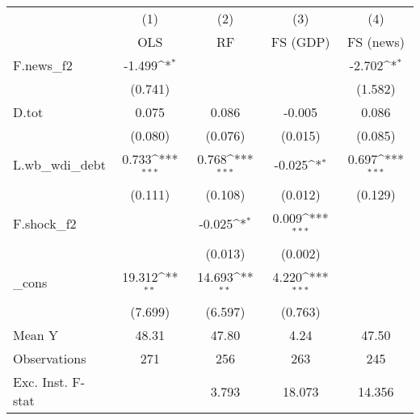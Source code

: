 {
\def\sym#1{\ifmmode^{#1}\else\(^{#1}\)\fi}
\begin{tabular}{l*{4}{c}}
\toprule
            &\multicolumn{1}{c}{(1)}&\multicolumn{1}{c}{(2)}&\multicolumn{1}{c}{(3)}&\multicolumn{1}{c}{(4)}\\
            &\multicolumn{1}{c}{OLS}&\multicolumn{1}{c}{RF}&\multicolumn{1}{c}{FS (GDP)}&\multicolumn{1}{c}{FS (news)}\\
\midrule
F.news\_f2   &      -1.499\sym{*}  &                     &                     &      -2.702\sym{*}  \\
            &     (0.741)         &                     &                     &     (1.582)         \\
\addlinespace
D.tot       &       0.075         &       0.086         &      -0.005         &       0.086         \\
            &     (0.080)         &     (0.076)         &     (0.015)         &     (0.085)         \\
\addlinespace
L.wb\_wdi\_debt&       0.733\sym{***}&       0.768\sym{***}&      -0.025\sym{*}  &       0.697\sym{***}\\
            &     (0.111)         &     (0.108)         &     (0.012)         &     (0.129)         \\
\addlinespace
F.shock\_f2  &                     &      -0.025\sym{*}  &       0.009\sym{***}&                     \\
            &                     &     (0.013)         &     (0.002)         &                     \\
\addlinespace
\_cons      &      19.312\sym{**} &      14.693\sym{**} &       4.220\sym{***}&                     \\
            &     (7.699)         &     (6.597)         &     (0.763)         &                     \\
\midrule
Mean Y      &       48.31         &       47.80         &        4.24         &       47.50         \\
Observations&         271         &         256         &         263         &         245         \\
Exc. Inst. F-stat&                     &       3.793         &      18.073         &      14.356         \\
\bottomrule
\end{tabular}
}
